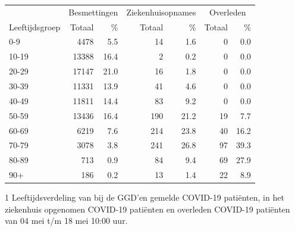 \documentclass[
  english,
  man,floatsintext]{apa6}
\begin{document}
\begin{table}
\centering\begingroup\fontsize{11}{13}\selectfont

\begin{threeparttable}
\begin{tabular}{lrrrrrr}
\toprule
\multicolumn{1}{c}{ } & \multicolumn{2}{c}{Besmettingen} & \multicolumn{2}{c}{Ziekenhuisopnames} & \multicolumn{2}{c}{Overleden} \\
\cmidrule(l{3pt}r{3pt}){2-3} \cmidrule(l{3pt}r{3pt}){4-5} \cmidrule(l{3pt}r{3pt}){6-7}
Leeftijdsgroep & Totaal & \% & Totaal & \% & Totaal & \%\\
\midrule
0-9 & 4478 & 5.5 & 14 & 1.6 & 0 & 0.0\\
10-19 & 13388 & 16.4 & 2 & 0.2 & 0 & 0.0\\
20-29 & 17147 & 21.0 & 16 & 1.8 & 0 & 0.0\\
30-39 & 11331 & 13.9 & 41 & 4.6 & 0 & 0.0\\
40-49 & 11811 & 14.4 & 83 & 9.2 & 0 & 0.0\\
50-59 & 13436 & 16.4 & 190 & 21.2 & 19 & 7.7\\
60-69 & 6219 & 7.6 & 214 & 23.8 & 40 & 16.2\\
70-79 & 3078 & 3.8 & 241 & 26.8 & 97 & 39.3\\
80-89 & 713 & 0.9 & 84 & 9.4 & 69 & 27.9\\
90+ & 186 & 0.2 & 13 & 1.4 & 22 & 8.9\\
\bottomrule
\end{tabular}
\begin{tablenotes}
\item[1] Leeftijdsverdeling van bij de GGD’en gemelde COVID-19 patiënten, in het ziekenhuis opgenomen COVID-19 patiënten en overleden COVID-19 patiënten van 04 mei t/m 18 mei 10:00 uur.
\end{tablenotes}
\end{threeparttable}
\endgroup{}
\end{table}

\newpage
\end{document}
